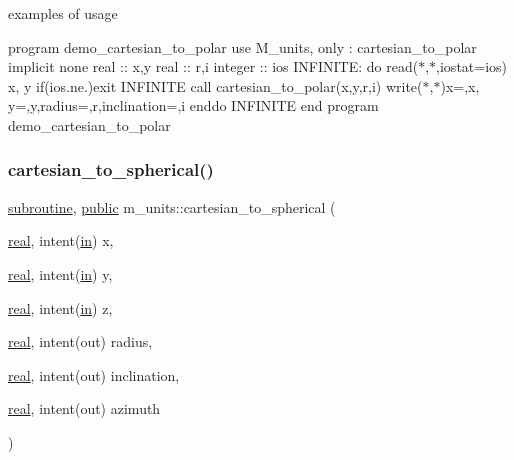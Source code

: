 examples of usage

program demo\+\_\+cartesian\+\_\+to\+\_\+polar use M\+\_\+units, only \+: cartesian\+\_\+to\+\_\+polar implicit none real \+:\+: x,y real \+:\+: r,i integer \+:\+: ios I\+N\+F\+I\+N\+I\+TE\+: do read($\ast$,$\ast$,iostat=ios) x, y if(ios.\+ne.)exit I\+N\+F\+I\+N\+I\+TE call cartesian\+\_\+to\+\_\+polar(x,y,r,i) write($\ast$,$\ast$)\textquotesingle{}x=\textquotesingle{},x,\textquotesingle{} y=\textquotesingle{},y,\textquotesingle{}radius=\textquotesingle{},r,\textquotesingle{}inclination=\textquotesingle{},i enddo I\+N\+F\+I\+N\+I\+TE end program demo\+\_\+cartesian\+\_\+to\+\_\+polar \mbox{\label{namespacem__units_a3a1fe55d63ec4ac38f3d00005f9ebac5}} 
\subsubsection{\texorpdfstring{cartesian\+\_\+to\+\_\+spherical()}{cartesian\_to\_spherical()}}
{\footnotesize\ttfamily \hyperlink{M__stopwatch_83_8txt_acfbcff50169d691ff02d4a123ed70482}{subroutine}, \hyperlink{M__stopwatch_83_8txt_a2f74811300c361e53b430611a7d1769f}{public} m\+\_\+units\+::cartesian\+\_\+to\+\_\+spherical (\begin{DoxyParamCaption}\item[{\hyperlink{read__watch_83_8txt_abdb62bde002f38ef75f810d3a905a823}{real}, intent(\hyperlink{M__journal_83_8txt_afce72651d1eed785a2132bee863b2f38}{in})}]{x,  }\item[{\hyperlink{read__watch_83_8txt_abdb62bde002f38ef75f810d3a905a823}{real}, intent(\hyperlink{M__journal_83_8txt_afce72651d1eed785a2132bee863b2f38}{in})}]{y,  }\item[{\hyperlink{read__watch_83_8txt_abdb62bde002f38ef75f810d3a905a823}{real}, intent(\hyperlink{M__journal_83_8txt_afce72651d1eed785a2132bee863b2f38}{in})}]{z,  }\item[{\hyperlink{read__watch_83_8txt_abdb62bde002f38ef75f810d3a905a823}{real}, intent(out)}]{radius,  }\item[{\hyperlink{read__watch_83_8txt_abdb62bde002f38ef75f810d3a905a823}{real}, intent(out)}]{inclination,  }\item[{\hyperlink{read__watch_83_8txt_abdb62bde002f38ef75f810d3a905a823}{real}, intent(out)}]{azimuth }\end{DoxyParamCaption})}



